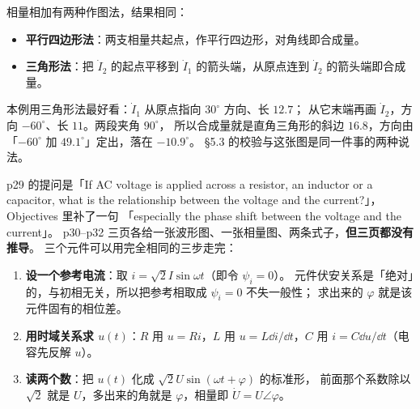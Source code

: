 \documentclass[11pt]{ctexart}
\begin{document}


相量相加有两种作图法，结果相同：

\begin{itemize}
\item \textbf{平行四边形法}：两支相量共起点，作平行四边形，对角线即合成量。
\item \textbf{三角形法}：把 $\dot I_2$ 的起点平移到 $\dot I_1$ 的箭头端，从原点连到 $\dot I_2$ 的箭头端即合成量。
\end{itemize}

本例用三角形法最好看：$\dot I_1$ 从原点指向 $30^\circ$ 方向、长 $12.7$；
从它末端再画 $\dot I_2$，方向 $-60^\circ$、长 $11$。两段夹角 $90^\circ$，
所以合成量就是直角三角形的斜边 $16.8$，方向由「$-60^\circ$ 加 $49.1^\circ$」定出，落在 $-10.9^\circ$。
§5.3 的校验与这张图是同一件事的两种说法。




p29 的提问是「If AC voltage is applied across a resistor, an inductor or a capacitor, what is the
relationship between the voltage and the current?」，Objectives 里补了一句
「especially the phase shift between the voltage and the current」。
p30--p32 三页各给一张波形图、一张相量图、两条式子，\textbf{但三页都没有推导}。
三个元件可以用完全相同的三步走完：

\begin{enumerate}
\item \textbf{设一个参考电流}：取 $i=\sqrt2I\sin\omega t$（即令 $\psi_i=0$）。
元件伏安关系是「绝对」的，与初相无关，所以把参考相取成 $\psi_i=0$ 不失一般性；
求出来的 $\varphi$ 就是该元件固有的相位差。
\item \textbf{用时域关系求 $u(t)$}：$R$ 用 $u=Ri$，$L$ 用 $u=L\dd i/\dd t$，$C$ 用 $i=C\dd u/\dd t$（电容先反解 $u$）。
\item \textbf{读两个数}：把 $u(t)$ 化成 $\sqrt2U\sin(\omega t+\varphi)$ 的标准形，
前面那个系数除以 $\sqrt2$ 就是 $U$，多出来的角就是 $\varphi$，相量即 $\dot U=U\angle\varphi$。
\end{enumerate}
\end{document}
